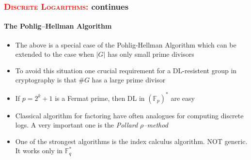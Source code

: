 \documentclass[10pt,handout]{beamer} %
\newcommand{\F}{\mathbb F}
\theoremstyle{definition}
\begin{document}
\begin{frame}
\frametitle{\textcolor{red}{\textsc{Discrete Logarithms:}} continues} 
\framesubtitle{The Pohlig--Hellman Algorithm}

\begin{itemize}[<+-| alert@+>]
\item The above is a special case of the Pohlig-Hellman Algorithm which can be extended to the case when $|G|$ has only small prime divisors
\item To avoid this situation one crucial requirement for a DL-resistent group in cryptography is that $\#G$ has a large prime divisor
\item If $p=2^k+1$ is a Fermat prime, then DL in $(\F_p)^*$ are easy
\item Classical algorithm for factoring have often analogues for computing discrete logs. A very important one  is the \emph{Pollard $\rho$--method}
\item One of the strongest algorithms is the \alert{index calculus algorithm.} NOT generic. It works only in ${\mathbb F}_q^*$
\end{itemize}
\end{frame}
\end{document}
